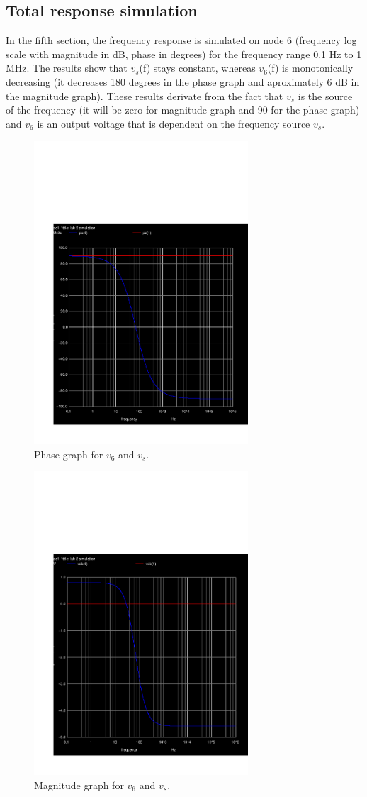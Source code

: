 \subsection{Total response simulation}
In the fifth section, the frequency response is simulated on node 6 (frequency log scale with magnitude in dB, phase in degrees) for the frequency range 0.1 Hz to 1 MHz. The results show that $v_s$(f) stays constant, whereas $v_6$(f) is monotonically decreasing (it decreases 180 degrees in the phase graph and aproximately 6 dB in the magnitude graph). These results derivate from the fact that $v_s$ is the source of the frequency (it will be zero for magnitude graph and 90 for the phase graph) and $v_6$ is an output voltage that is dependent on the frequency source $v_s$.

\begin{figure}[h!] \centering
\includegraphics[width=8cm]{../sim/acp.pdf}
\caption{Phase graph for $v_6$ and $v_s$.}
\label{fig:phase}
\end{figure}

\begin{figure}[h!] \centering
\includegraphics[width=8cm]{../sim/acm.pdf}
\caption{Magnitude graph for $v_6$ and $v_s$.}
\label{fig:magnitude}
\end{figure}





